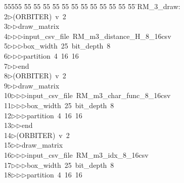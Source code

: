 %
%
\begin{tabbing}
55555 \= 55 \= 55 \= 55 \= 55 \= 55 \= 55 \= 55 \= 55 \= 55 \= 55 \= 55 \= 55 \= \>RM\_3\_draw:\\[0pt]
2\>$\triangleright$\>(ORBITER)\ v\ 2\ \\[0pt]
3\>$\triangleright$\>$\triangleright$\>draw\_matrix\ \\[0pt]
4\>$\triangleright$\>$\triangleright$\>$\triangleright$\>input\_csv\_file\ RM\_m3\_distance\_H\_8\_16csv\ \\[0pt]
5\>$\triangleright$\>$\triangleright$\>$\triangleright$\>box\_width\ 25\ bit\_depth\ 8\ \\[0pt]
6\>$\triangleright$\>$\triangleright$\>$\triangleright$\>partition\ 4\ 16\ 16\ \\[0pt]
7\>$\triangleright$\>$\triangleright$\>end\\[0pt]
8\>$\triangleright$\>(ORBITER)\ v\ 2\ \\[0pt]
9\>$\triangleright$\>$\triangleright$\>draw\_matrix\ \\[0pt]
10\>$\triangleright$\>$\triangleright$\>$\triangleright$\>input\_csv\_file\ RM\_m3\_char\_func\_8\_16csv\ \\[0pt]
11\>$\triangleright$\>$\triangleright$\>$\triangleright$\>box\_width\ 25\ bit\_depth\ 8\ \\[0pt]
12\>$\triangleright$\>$\triangleright$\>$\triangleright$\>partition\ 4\ 16\ 16\ \\[0pt]
13\>$\triangleright$\>$\triangleright$\>end\\[0pt]
14\>$\triangleright$\>(ORBITER)\ v\ 2\ \\[0pt]
15\>$\triangleright$\>$\triangleright$\>draw\_matrix\ \\[0pt]
16\>$\triangleright$\>$\triangleright$\>$\triangleright$\>input\_csv\_file\ RM\_m3\_idx\_8\_16csv\ \\[0pt]
17\>$\triangleright$\>$\triangleright$\>$\triangleright$\>box\_width\ 25\ bit\_depth\ 8\ \\[0pt]
18\>$\triangleright$\>$\triangleright$\>$\triangleright$\>partition\ 4\ 16\ 16\ \\[0pt]

\end{tabbing}
